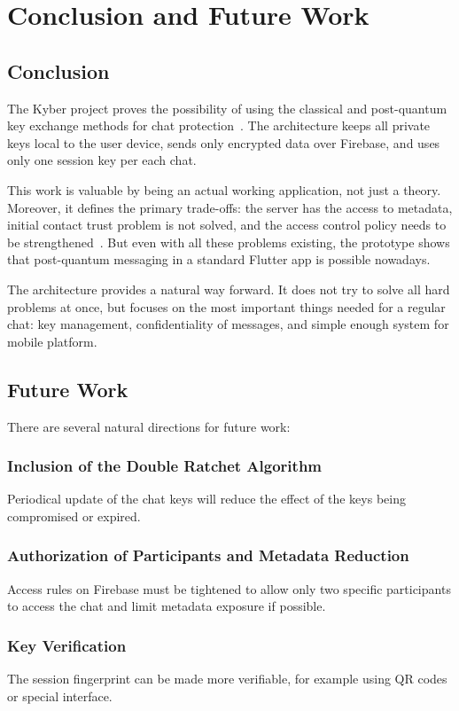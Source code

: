 \section{Conclusion and Future Work}

\subsection{Conclusion}
The Kyber project proves the possibility of using the classical and post-quantum key exchange methods for chat protection~\cite{rfc7748,fips203,pqxdh}. The architecture keeps all private keys local to the user device, sends only encrypted data over Firebase, and uses only one session key per each chat.

This work is valuable by being an actual working application, not just a theory. Moreover, it defines the primary trade-offs: the server has the access to metadata, initial contact trust problem is not solved, and the access control policy needs to be strengthened~\cite{dolev_yao}. But even with all these problems existing, the prototype shows that post-quantum messaging in a standard Flutter app is possible nowadays.

The architecture provides a natural way forward. It does not try to solve all hard problems at once, but focuses on the most important things needed for a regular chat: key management, confidentiality of messages, and simple enough system for mobile platform.

\subsection{Future Work}
There are several natural directions for future work:

\subsubsection{Inclusion of the Double Ratchet Algorithm}
Periodical update of the chat keys will reduce the effect of the keys being compromised or expired.

\subsubsection{Authorization of Participants and Metadata Reduction}
Access rules on Firebase must be tightened to allow only two specific participants to access the chat and limit metadata exposure if possible.

\subsubsection{Key Verification}
The session fingerprint can be made more verifiable, for example using QR codes or special interface.

